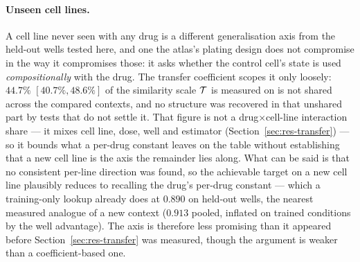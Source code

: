 \paragraph{Unseen cell lines.} A cell line never seen with any drug is a different generalisation
axis from the held-out wells tested here, and one the atlas's plating design does not compromise
in the way it compromises those: it asks
whether the control cell's state is used \emph{compositionally} with the drug. The transfer
coefficient scopes it only loosely: $44.7\%$ \nolinebreak[3]$[40.7\%, 48.6\%]$ of the similarity
scale $\mathcal{T}$ is measured on is not shared across the compared contexts, and no structure was
recovered in that unshared part by tests that do not settle it. That
figure is not a drug$\times$cell-line interaction share --- it mixes cell line, dose, well and
estimator (Section~\ref{sec:res-transfer}) --- so it bounds what a per-drug constant leaves on the
table without establishing that a new cell line is the axis the remainder lies along. What can be
said is that no consistent per-line direction was found, so the achievable target on a new cell line
plausibly reduces to recalling the drug's per-drug constant --- which a training-only lookup already
does at $0.890$ on held-out wells, the nearest measured analogue of a new context ($0.913$
pooled, inflated on trained conditions by the well advantage). The axis is therefore less promising than it appeared before
Section~\ref{sec:res-transfer} was measured, though the argument is weaker than a coefficient-based
one.

